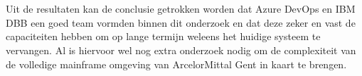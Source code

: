 \\ \\ 
Uit de resultaten kan de conclusie getrokken worden dat Azure DevOps en IBM DBB een goed team vormden binnen dit onderzoek en dat deze zeker en vast de capaciteiten hebben om op lange termijn weleens het huidige systeem te vervangen. Al is hiervoor wel nog extra onderzoek nodig om de complexiteit van de volledige mainframe omgeving van ArcelorMittal Gent in kaart te brengen.

